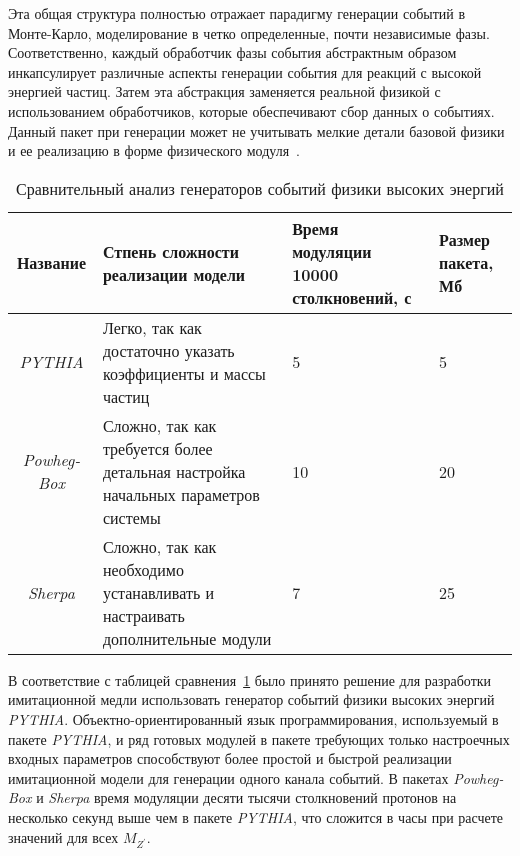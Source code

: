 Эта общая структура полностью отражает парадигму генерации событий в Монте-Карло,
моделирование в четко определенные, почти независимые фазы. Соответственно, каждый обработчик фазы события абстрактным образом инкапсулирует различные аспекты генерации события для реакций с высокой энергией частиц.
Затем эта абстракция заменяется реальной физикой с использованием обработчиков, которые обеспечивают сбор данных о событиях. Данный пакет при генерации может не учитывать мелкие детали базовой физики и ее реализацию в форме физического модуля~\cite{review-sherpa}.

\begin{table}[h!]
	\begin{flushleft}
		\caption{Сравнительный анализ генераторов событий физики
			высоких энергий}
		\label{tab:table1}
		\begin{tabular}{ | c | p{5cm} | p{4cm} | p{4cm} |}
			\hline
			Название & Стпень сложности реализации модели & Время модуляции 10000 столкновений, с & Размер пакета, Мб \\ \hline
			\textit{PYTHIA} & Легко, так как достаточно указать коэффициенты и массы частиц & \hspace{2cm}5 & \hspace{2cm}5 \\ \hline
			\textit{Powheg-Box} & Сложно, так как требуется более детальная настройка начальных параметров системы & \hspace{2cm}10 & \hspace{2cm}20 \\ \hline
			\textit{Sherpa} & Сложно, так как необходимо устанавливать и настраивать дополнительные модули & \hspace{2cm}7 & \hspace{2cm}25 \\
			\hline
		\end{tabular}
	\end{flushleft}
\end{table}

В соответствие с таблицей сравнения~\ref{tab:table1} было принято решение для разработки имитационной медли использовать генератор событий физики
высоких энергий \textit{PYTHIA}. Объектно-ориентированный язык программирования, используемый в пакете \textit{PYTHIA}, и ряд готовых модулей в пакете требующих только настроечных входных параметров способствуют более простой и быстрой реализации имитационной модели для генерации одного канала событий. В пакетах \textit{Powheg-Box} и \textit{Sherpa} время модуляции десяти тысячи столкновений протонов на несколько секунд выше чем в пакете \textit{PYTHIA}, что сложится в часы при расчете значений для всех ${M}_{{Z}^{\prime}}$.


